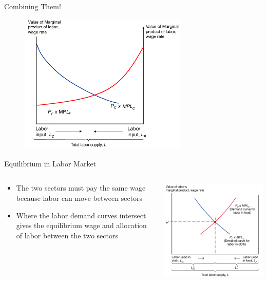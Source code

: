 \documentclass[10pt,hyperref={CJKbookmarks=true},xcolor=dvipsnames,aspectratio=169]{beamer}
\begin{document}
\begin{frame}{Combining Them! }


\begin{figure}


\begin{centering}
\includegraphics[width=8cm]{fig/sfm/lec4-12}
\par\end{centering}

\end{figure}

\end{frame}

\begin{frame}{Equilibrium in Labor Market }


\begin{columns}[onlytextwidth]
\begin{column}{0.3\textwidth}
\begin{itemize}
\item The two sectors must pay the same wage because labor can move between
sectors 
\item Where the labor demand curves intersect gives the equilibrium wage
and allocation of labor between the two sectors 
\end{itemize}

\end{column}
\begin{column}{0.7\textwidth}
\centering \includegraphics[width=0.6\columnwidth]{fig/sfm/lec4-13}
\end{column}
\end{columns}

\end{frame}
\end{document}

